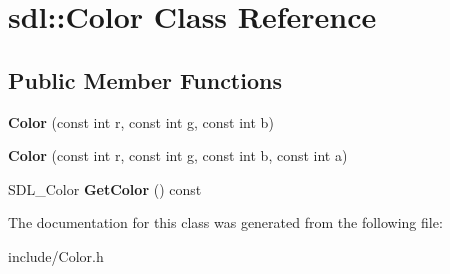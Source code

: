 \hypertarget{classsdl_1_1Color}{\section{sdl\-:\-:Color Class Reference}
\label{classsdl_1_1Color}
}
\subsection*{Public Member Functions}
\begin{DoxyCompactItemize}
\item 
\hypertarget{classsdl_1_1Color_a7e46b3d29d0d607544e176e086afae6e}{{\bfseries Color} (const int r, const int g, const int b)}\label{classsdl_1_1Color_a7e46b3d29d0d607544e176e086afae6e}

\item 
\hypertarget{classsdl_1_1Color_ac90c2ef2640861ff4d57212b6eba1fef}{{\bfseries Color} (const int r, const int g, const int b, const int a)}\label{classsdl_1_1Color_ac90c2ef2640861ff4d57212b6eba1fef}

\item 
\hypertarget{classsdl_1_1Color_a3be9928b2ebc1ef14d2dd0c438a070b7}{S\-D\-L\-\_\-\-Color {\bfseries Get\-Color} () const }\label{classsdl_1_1Color_a3be9928b2ebc1ef14d2dd0c438a070b7}

\end{DoxyCompactItemize}


The documentation for this class was generated from the following file\-:\begin{DoxyCompactItemize}
\item 
include/Color.\-h\end{DoxyCompactItemize}
